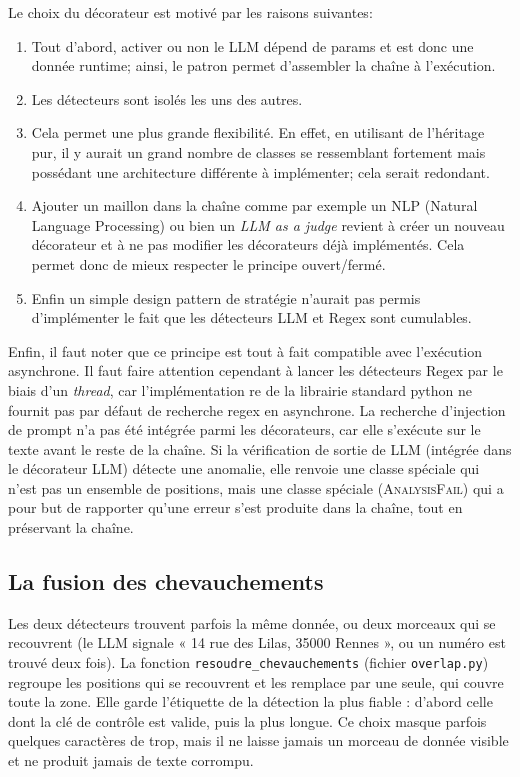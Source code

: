 \documentclass[12pt,a4paper]{article}
\begin{document}
Le choix du décorateur est motivé par les raisons suivantes:
\begin{enumerate}
  \item Tout d'abord, activer ou non le LLM dépend de params et est donc une donnée runtime; ainsi, le patron permet d’assembler la chaîne à l'exécution.
  \item Les détecteurs sont isolés les uns des autres.
  \item Cela permet une plus grande flexibilité. En effet, en utilisant de l'héritage pur, il y aurait un grand nombre de classes se ressemblant fortement mais possédant une architecture différente à implémenter; cela serait redondant.
  \item Ajouter un maillon dans la chaîne comme par exemple un NLP (Natural Language Processing) ou bien un \textit{LLM as a judge} revient à créer un nouveau décorateur et à ne pas modifier les décorateurs déjà implémentés. Cela permet donc de mieux respecter le principe ouvert/fermé.
  \item Enfin un simple design pattern de stratégie n'aurait pas permis d'implémenter le fait que les détecteurs LLM et Regex sont cumulables.
\end{enumerate}

Enfin, il faut noter que ce principe est tout à fait compatible avec l'exécution asynchrone. Il faut faire attention cependant à lancer les détecteurs Regex par le biais d’un \textit{thread}, car l'implémentation re de la librairie standard python ne fournit pas par défaut de recherche regex en asynchrone. La recherche d’injection de prompt n’a pas été intégrée parmi les décorateurs, car elle s’exécute sur le texte avant le reste de la chaîne. Si la vérification de sortie de LLM (intégrée dans le décorateur LLM) détecte une anomalie, elle renvoie une classe spéciale qui n’est pas un ensemble de positions, mais une classe spéciale (\textsc{AnalysisFail}) qui a pour but de rapporter qu’une erreur s’est produite dans la chaîne, tout en préservant la chaîne.

\subsection{La fusion des chevauchements}
\label{sec:chevauchements}

Les deux détecteurs trouvent parfois la même donnée, ou deux morceaux qui se recouvrent (le LLM signale « 14 rue des Lilas, 35000 Rennes », ou un numéro est trouvé deux fois). La fonction \texttt{resoudre\_chevauchements} (fichier \texttt{overlap.py}) regroupe les positions qui se recouvrent et les remplace par une seule, qui couvre toute la zone. Elle garde l'étiquette de la détection la plus fiable : d'abord celle dont la clé de contrôle est valide, puis la plus longue. Ce choix masque parfois quelques caractères de trop, mais il ne laisse jamais un morceau de donnée visible et ne produit jamais de texte corrompu.
\end{document}
